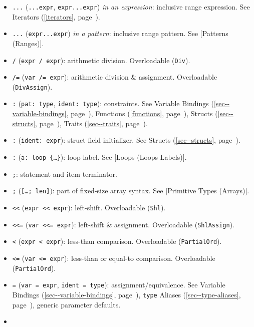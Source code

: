 \documentclass[a4paper,]{book}
\renewcommand*{\hyperlink}[2]{%
 #2 (\autoref{#1}, page~\pageref{#1})}
\begin{document}
\begin{itemize}
\item
  \texttt{...} (\texttt{...expr}, \texttt{expr...expr}) \emph{in an
  expression}: inclusive range expression. See
  \protect\hyperlink{iterators}{Iterators}.
\item
  \texttt{...} (\texttt{expr...expr}) \emph{in a pattern}: inclusive
  range pattern. See {[}Patterns (Ranges){]}.
\item
  \texttt{/} (\texttt{expr\ /\ expr}): arithmetic division. Overloadable
  (\texttt{Div}).
\item
  \texttt{/=} (\texttt{var\ /=\ expr}): arithmetic division \&
  assignment. Overloadable (\texttt{DivAssign}).
\item
  \texttt{:} (\texttt{pat:\ type}, \texttt{ident:\ type}): constraints.
  See \protect\hyperlink{sec--variable-bindings}{Variable Bindings},
  \protect\hyperlink{functions}{Functions},
  \protect\hyperlink{sec--structs}{Structs},
  \protect\hyperlink{sec--traits}{Traits}.
\item
  \texttt{:} (\texttt{ident:\ expr}): struct field initializer. See
  \protect\hyperlink{sec--structs}{Structs}.
\item
  \texttt{:} (\texttt{\textquotesingle{}a:\ loop\ \{\ldots{}\}}): loop
  label. See {[}Loops (Loops Labels){]}.
\item
  \texttt{;}: statement and item terminator.
\item
  \texttt{;} (\texttt{{[}\ldots{};\ len{]}}): part of fixed-size array
  syntax. See {[}Primitive Types (Arrays){]}.
\item
  \texttt{\textless{}\textless{}}
  (\texttt{expr\ \textless{}\textless{}\ expr}): left-shift.
  Overloadable (\texttt{Shl}).
\item
  \texttt{\textless{}\textless{}=}
  (\texttt{var\ \textless{}\textless{}=\ expr}): left-shift \&
  assignment. Overloadable (\texttt{ShlAssign}).
\item
  \texttt{\textless{}} (\texttt{expr\ \textless{}\ expr}): less-than
  comparison. Overloadable (\texttt{PartialOrd}).
\item
  \texttt{\textless{}=} (\texttt{var\ \textless{}=\ expr}): less-than or
  equal-to comparison. Overloadable (\texttt{PartialOrd}).
\item
  \texttt{=} (\texttt{var\ =\ expr}, \texttt{ident\ =\ type}):
  assignment/equivalence. See
  \protect\hyperlink{sec--variable-bindings}{Variable Bindings},
  \protect\hyperlink{sec--type-aliases}{\texttt{type} Aliases}, generic
  parameter defaults.
\item

\end{itemize}
\end{document}
